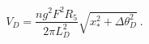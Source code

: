 \begin{equation}
 V_D= \frac{ n g^2 F^2 R_5}{2\pi
L_D^2}\sqrt{x_{*}^2+\Delta \theta_D^2}\ .
\end{equation}

